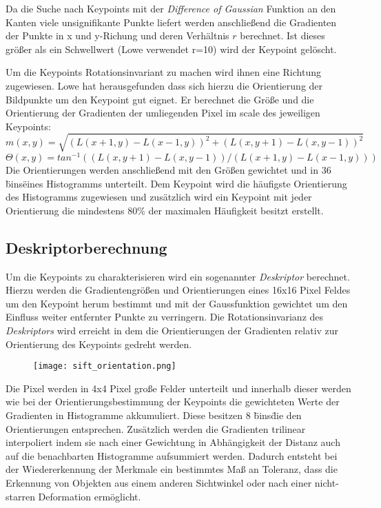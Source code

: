 Da die Suche nach Keypoints mit der \emph{Difference of Gaussian} Funktion an den Kanten viele unsignifikante Punkte liefert werden anschließend die Gradienten der Punkte in x und y-Richung und deren Verhältnis $ r $ berechnet. Ist dieses größer als ein Schwellwert (Lowe verwendet r=10) wird der Keypoint gelöscht.

Um die Keypoints Rotationsinvariant zu machen wird ihnen eine Richtung zugewiesen. Lowe hat herausgefunden dass sich hierzu die Orientierung der Bildpunkte um den Keypoint gut eignet. 
Er berechnet die Größe und die Orientierung der Gradienten der umliegenden Pixel im \Gls{scale} des jeweiligen Keypoints:
\begin{equation}
m(x, y) = \sqrt{(L(x + 1, y) - L(x - 1, y))^{2} + (L(x, y + 1) - L(x, y - 1))^{2}}
\end{equation}
\begin{equation}
\Theta (x, y) = tan^{-1}((L(x, y + 1) - L(x, y - 1))/(L(x + 1, y) - L(x - 1, y)))
\end{equation}
Die Orientierungen werden anschließend mit den Größen gewichtet und in 36 \"bins\" eines Histogramms unterteilt. Dem Keypoint wird die häufigste Orientierung des Histogramms zugewiesen und zusätzlich wird ein Keypoint mit jeder Orientierung die mindestens 80\% der maximalen Häufigkeit besitzt erstellt.

\subsection{Deskriptorberechnung}

Um die Keypoints zu charakterisieren wird ein sogenannter \emph{Deskriptor} berechnet.
Hierzu werden die Gradientengrößen und Orientierungen eines 16x16 Pixel Feldes um den Keypoint herum bestimmt und mit der Gaussfunktion gewichtet um den Einfluss weiter entfernter Punkte zu verringern.
Die Rotationsinvarianz des \emph{Deskriptors} wird erreicht in dem die Orientierungen der Gradienten relativ zur Orientierung des Keypoints gedreht werden.

\begin{figure}[h]
\texttt{[image: sift\_orientation.png]}
\centering
\end{figure}

Die Pixel werden in 4x4 Pixel große Felder unterteilt und innerhalb dieser werden wie bei der Orientierungsbestimmung der Keypoints die gewichteten Werte der Gradienten in Histogramme akkumuliert. Diese besitzen 8 \"bins\" die den Orientierungen entsprechen. Zusätzlich werden die Gradienten trilinear interpoliert indem sie nach einer Gewichtung in Abhängigkeit der Distanz auch auf die benachbarten Histogramme aufsummiert werden. Dadurch entsteht bei der Wiedererkennung der Merkmale ein bestimmtes Maß an Toleranz, dass die Erkennung von Objekten aus einem anderen Sichtwinkel oder nach einer nicht-starren Deformation ermöglicht.

